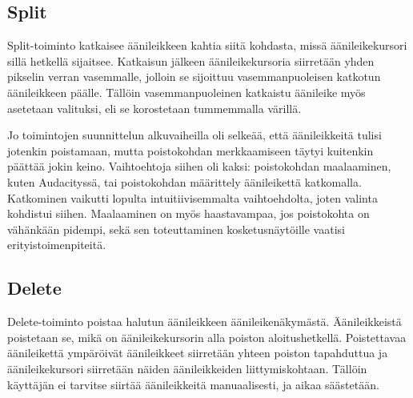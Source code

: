 \documentclass[utf8]{gradu3}
\begin{document}
\subsection{Split}

Split-toiminto katkaisee äänileikkeen kahtia siitä kohdasta, missä äänileikekursori sillä hetkellä sijaitsee. Katkaisun jälkeen äänileikekursoria siirretään yhden pikselin verran vasemmalle, jolloin se sijoittuu vasemmanpuoleisen katkotun äänileikkeen päälle. Tällöin vasemmanpuoleinen katkaistu äänileike myös asetetaan valituksi, eli se korostetaan tummemmalla värillä.

Jo toimintojen suunnittelun alkuvaiheilla oli selkeää, että äänileikkeitä tulisi jotenkin poistamaan, mutta poistokohdan merkkaamiseen täytyi kuitenkin päättää jokin keino. Vaihtoehtoja siihen oli kaksi: poistokohdan maalaaminen, kuten Audacityssä, tai poistokohdan määrittely äänileikettä katkomalla. Katkominen vaikutti lopulta intuitiivisemmalta vaihtoehdolta, joten valinta kohdistui siihen. Maalaaminen on myös haastavampaa, jos poistokohta on vähänkään pidempi, sekä sen toteuttaminen kosketusnäytöille vaatisi erityistoimenpiteitä.

\subsection{Delete}

Delete-toiminto poistaa halutun äänileikkeen äänileikenäkymästä. Äänileikkeistä poistetaan se, mikä on äänileikekursorin alla poiston aloitushetkellä. Poistettavaa äänileikettä ympäröivät äänileikkeet siirretään yhteen poiston tapahduttua ja äänileikekursori siirretään näiden äänileikkeiden liittymiskohtaan. Tällöin käyttäjän ei tarvitse siirtää äänileikkeitä manuaalisesti, ja aikaa säästetään.
\end{document}

